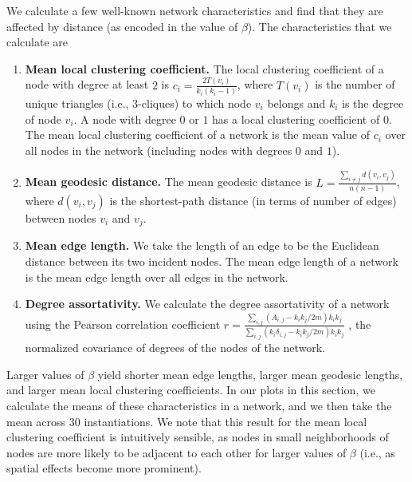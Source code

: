 \documentclass[%
 reprint,
 amsmath,amssymb,
 aps,
]{revtex4-1}
\begin{document}
We calculate a few well-known network characteristics \cite{newman2018} and find that they are affected by distance (as encoded in the value of $\beta$). The characteristics that we calculate are
\begin{enumerate}\label{characteristics_definitions}
    \item {\bf Mean local clustering coefficient.} The local clustering coefficient of a node with degree at least $2$ is $c_i = \frac{2T(v_i)}{k_i(k_i - 1)}$, where $T(v_i)$ is the number of unique triangles (i.e., $3$-cliques) to which node $v_i$ belongs and $k_i$ is the degree of node $v_i$. A node with degree $0$ or $1$ has a local clustering coefficient of $0$. {\color{red}The mean local clustering coefficient of a network is the mean value of $c_i$ over all nodes in the network (including nodes with degrees $0$ and $1$).} 
    \item {\bf Mean geodesic distance.} The mean geodesic distance is  $L = \frac{\sum_{i \neq j}d(v_i, v_j)}{n(n-1)}$, where $d(v_i, v_j)$ is the shortest-path distance (in terms of number of edges) between nodes $v_i$ and $v_j$.
    \item {\bf Mean edge length.} We take the length of an edge to be the Euclidean distance between its two incident nodes. The mean edge length of a network is the mean edge length over all edges in the network.
    \item {\bf Degree assortativity.} We calculate the degree assortativity of a network using {\color{red}the Pearson correlation coefficient} $r = \frac{\sum_{i,j}(A_{i,j}-k_i k_j/2m)k_i k_j}{\sum_{i,j}(k_i \delta_{i,j}-k_i k_j/2m)k_i k_j}$ \cite{newman2018}, the normalized covariance of degrees of the nodes of the network.
\end{enumerate}


Larger values of $\beta$ yield shorter mean edge lengths, larger mean geodesic lengths, and larger mean local clustering coefficients. In our plots in this section, we calculate the means of these characteristics in a network, and we then take the mean across 30 instantiations.
We note that this result for the mean local clustering coefficient is intuitively sensible, as nodes in small neighborhoods of nodes are more likely to be adjacent to each other for larger values of $\beta$ (i.e., as spatial effects become more prominent). 
\end{document}
